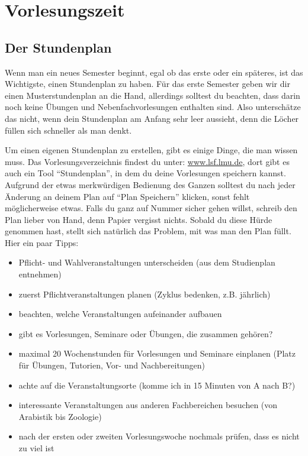 ﻿
\chapter{Vorlesungszeit}

\section{Der Stundenplan}

Wenn man ein neues Semester beginnt, egal ob das erste oder ein späteres, ist das Wichtigste, einen Stundenplan zu haben. Für das erste Semester geben wir dir einen Musterstundenplan an die Hand, allerdings solltest du beachten, dass darin noch keine Übungen und Nebenfachvorlesungen enthalten sind. Also unterschätze das nicht, wenn dein Stundenplan am Anfang sehr leer aussieht, denn die Löcher füllen sich schneller als man denkt.

Um einen eigenen Stundenplan zu erstellen, gibt es einige Dinge, die man wissen muss. Das Vorlesungsverzeichnis findest du unter: \url{www.lsf.lmu.de}, dort gibt es auch ein Tool ``Stundenplan'', in dem du deine Vorlesungen speichern kannst. Aufgrund der etwas merkwürdigen Bedienung des Ganzen solltest du nach jeder Änderung an deinem Plan auf ``Plan Speichern'' klicken, sonst fehlt möglicherweise etwas. Falls du ganz auf Nummer sicher gehen willst, schreib den Plan lieber von Hand, denn Papier vergisst nichts. Sobald du diese Hürde genommen hast, stellt sich natürlich das Problem, mit was man den Plan füllt. Hier ein paar Tipps:

\begin{itemize}
	\item Pflicht- und Wahlveranstaltungen unterscheiden (aus dem Studienplan entnehmen)
	\item zuerst Pflichtveranstaltungen planen (Zyklus bedenken, z.B. jährlich)
	\item beachten, welche Veranstaltungen aufeinander aufbauen
	\item gibt es Vorlesungen, Seminare oder Übungen, die zusammen gehören?
	\item maximal 20 Wochenstunden für Vorlesungen und Seminare einplanen (Platz für Übungen, Tutorien, Vor- und Nachbereitungen)
	\item achte auf die Veranstaltungsorte (komme ich in 15 Minuten von A nach B?)
	\item interessante Veranstaltungen aus anderen Fachbereichen besuchen (von Arabistik bis Zoologie)
	\item nach der ersten oder zweiten Vorlesungswoche nochmals prüfen, dass es nicht zu viel ist
\end{itemize}


